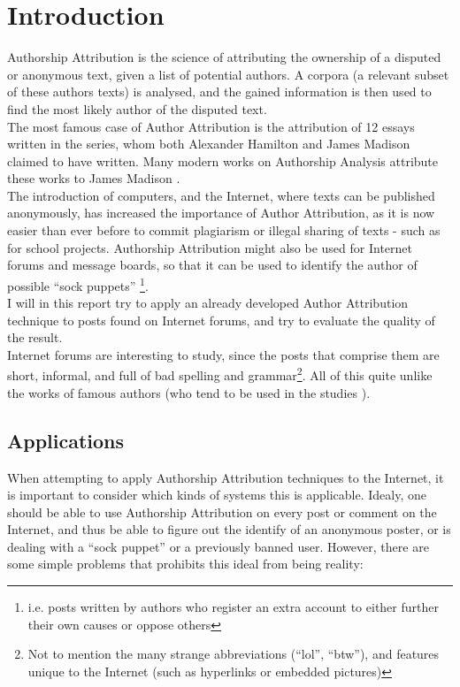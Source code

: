\section{Introduction}
\label{introduction}
Authorship Attribution is the science of attributing the ownership of a disputed or anonymous text, given a list of potential authors. A corpora (a relevant subset of these authors texts) is analysed, and the gained information is then used to find the most likely author of the disputed text.\\

The most famous case of Author Attribution is the attribution of 12 essays written in the  series, whom both Alexander Hamilton and James Madison claimed to have written. Many modern works on Authorship Analysis attribute these works to James Madison \cite{Fung03thedisputed}.\\
 The introduction of computers, and the Internet, where texts can be published anonymously, has increased the importance of Author Attribution, as it is now easier than ever before to commit plagiarism or illegal sharing of texts - such as for school projects. Authorship Attribution might also be used for Internet forums and message boards, so that it can be used to identify the author of possible ``sock puppets'' \footnote{i.e. posts written by authors who register an extra account to either further their own causes or oppose others}.\\ 

I will in this report try to apply an already developed Author Attribution technique to posts found on Internet forums, and try to evaluate the quality of the result.\\

Internet forums are interesting to study, since the posts that comprise them are short, informal, and full of bad spelling and grammar\footnote{Not to mention the many strange abbreviations (``lol'', ``btw''), and features unique to the Internet (such as hyperlinks or embedded pictures)}. All of this quite unlike the works of famous authors (who tend to be used in the studies \cite{nr4}). 

\subsection{Applications}
When attempting to apply Authorship Attribution techniques to the Internet, it is important to consider which kinds of systems this is applicable. Idealy, one should be able to use Authorship Attribution on every post or comment on the Internet, and thus be able to figure out the identify of an anonymous poster, or is dealing with a ``sock puppet'' or a previously banned user. However, there are some simple problems that prohibits this ideal from being reality:

